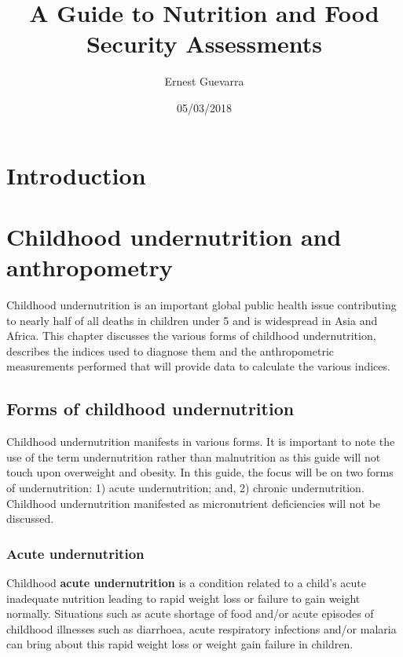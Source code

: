 \documentclass[12pt,]{book}
\title{A Guide to Nutrition and Food Security Assessments}
\author{Ernest Guevarra}
\date{05/03/2018}
\begin{document}
\maketitle

{
\setcounter{tocdepth}{1}
\tableofcontents
}
\hypertarget{introduction}{%
\chapter{Introduction}\label{introduction}}

\hypertarget{anthro}{%
\chapter{Childhood undernutrition and anthropometry}\label{anthro}}

Childhood undernutrition is an important global public health issue
contributing to nearly half of all deaths in children under 5 and is
widespread in Asia and Africa. This chapter discusses the various forms
of childhood undernutrition, describes the indices used to diagnose them
and the anthropometric measurements performed that will provide data to
calculate the various indices.

\hypertarget{forms-of-childhood-undernutrition}{%
\section{Forms of childhood
undernutrition}\label{forms-of-childhood-undernutrition}}

Childhood undernutrition manifests in various forms. It is important to
note the use of the term undernutrition rather than malnutrition as this
guide will not touch upon overweight and obesity. In this guide, the
focus will be on two forms of undernutrition: 1) acute undernutrition;
and, 2) chronic undernutrition. Childhood undernutrition manifested as
micronutrient deficiencies will not be discussed.

\hypertarget{acute-undernutrition}{%
\subsection{Acute undernutrition}\label{acute-undernutrition}}

Childhood \textbf{acute undernutrition} is a condition related to a
child's acute inadequate nutrition leading to rapid weight loss or
failure to gain weight normally. Situations such as acute shortage of
food and/or acute episodes of childhood illnesses such as diarrhoea,
acute respiratory infections and/or malaria can bring about this rapid
weight loss or weight gain failure in children.
\end{document}
